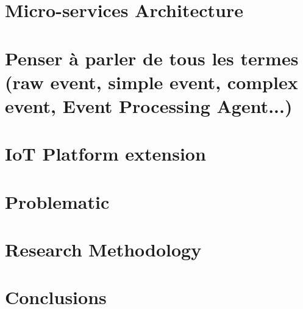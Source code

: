 \documentclass[11pt]{article}
\begin{document}
\section{Micro-services Architecture}

\section{Penser à parler de tous les termes (raw event, simple event, complex event, Event Processing Agent...)}


\section{IoT Platform extension}



\section{Problematic}


\section{Research Methodology}


\section{Conclusions}


\newpage
\listoffigures
\nocite{*}
\printbibliography
\end{document}
